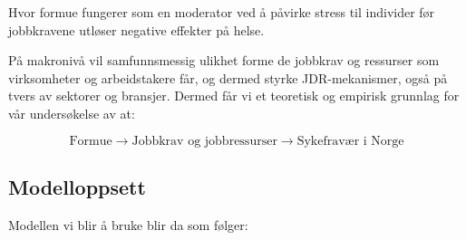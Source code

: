 \documentclass[
  12pt,
  a4paper,
  DIV=11,
  numbers=noendperiod]{scrartcl}
\begin{document}
Hvor formue fungerer som en moderator ved å påvirke stress til individer
før jobbkravene utløser negative effekter på helse.

På makronivå vil samfunnsmessig ulikhet forme de jobbkrav og ressurser
som virksomheter og arbeidstakere får, og dermed styrke JDR-mekanismer,
også på tvers av sektorer og bransjer. Dermed får vi et teoretisk og
empirisk grunnlag for vår undersøkelse av at:

\[
\text{Formue} \rightarrow \text{Jobbkrav og jobbressurser} \rightarrow \text{Sykefravær i Norge}
\]

\subsection{Modelloppsett}\label{modelloppsett}

Modellen vi blir å bruke blir da som følger:
\end{document}
